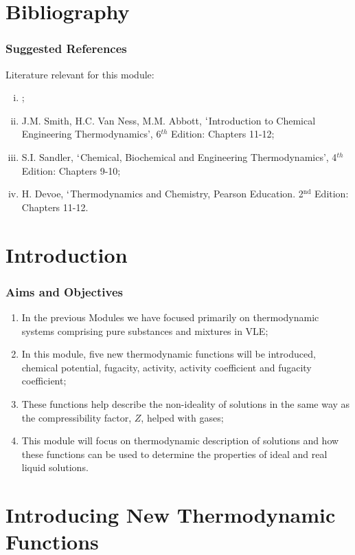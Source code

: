 \documentclass[10pt,compress,unknownkeysallowed]{beamer}
\begin{document}
\section{Bibliography}
\begin{frame}
 \frametitle{Suggested References}
  Literature relevant for this module:
  \begin{enumerate}[(i)]
   \item {};
   \item\label{SVN_Book} J.M. Smith, H.C. Van Ness, M.M. Abbott, $\lq$Introduction to Chemical Engineering Thermodynamics', 6$^{th}$ Edition: Chapters 11-12;
   \item\label{Sandle_Book} S.I. Sandler, $\lq$Chemical, Biochemical and Engineering Thermodynamics', 4$^{th}$ Edition: Chapters 9-10;
   \item H. Devoe, $\lq$Thermodynamics and Chemistry, Pearson Education. 2$^{\text{nd}}$ Edition: Chapters 11-12.
  \end{enumerate}
\end{frame}



\section{Introduction}

\begin{frame}
 \frametitle{Aims and Objectives}
    \begin{enumerate}
        \item<1-> In the previous Modules we have focused primarily on thermodynamic systems comprising pure substances and mixtures in VLE;
        \item<1-> In this module, five new thermodynamic functions will be introduced, chemical potential, fugacity, activity, activity coefficient and fugacity coefficient;
        \item<1-> These functions help describe the non-ideality of solutions in the same way as the compressibility factor, $Z$, helped with gases;
        \item<1-> This module will focus on thermodynamic description of solutions and how these functions can be used to determine the properties of ideal and real liquid solutions. 
   \end{enumerate}
\end{frame}


\section{Introducing New Thermodynamic Functions}
\end{document}
